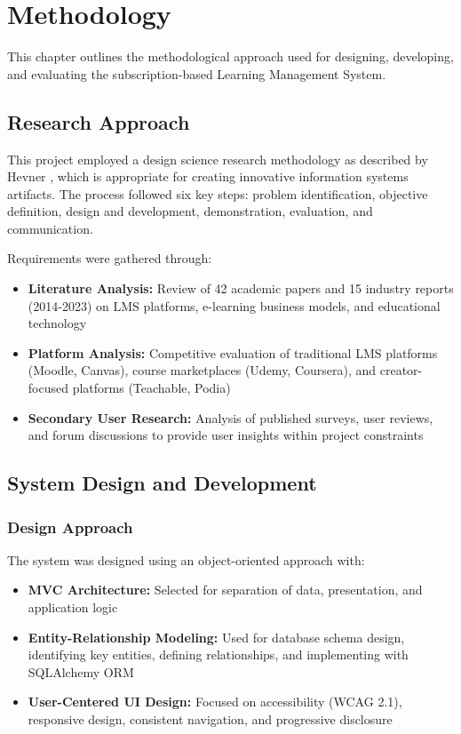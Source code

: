 \section{Methodology}

This chapter outlines the methodological approach used for designing, developing, and evaluating the subscription-based Learning Management System.

\subsection{Research Approach}

This project employed a design science research methodology as described by Hevner \cite{hevner2004}, which is appropriate for creating innovative information systems artifacts. The process followed six key steps: problem identification, objective definition, design and development, demonstration, evaluation, and communication.

Requirements were gathered through:

\begin{itemize}
    \item \textbf{Literature Analysis:} Review of 42 academic papers and 15 industry reports (2014-2023) on LMS platforms, e-learning business models, and educational technology
    
    \item \textbf{Platform Analysis:} Competitive evaluation of traditional LMS platforms (Moodle, Canvas), course marketplaces (Udemy, Coursera), and creator-focused platforms (Teachable, Podia)
    
    \item \textbf{Secondary User Research:} Analysis of published surveys, user reviews, and forum discussions to provide user insights within project constraints
\end{itemize}

\subsection{System Design and Development}

\subsubsection{Design Approach}

The system was designed using an object-oriented approach with:

\begin{itemize}
    \item \textbf{MVC Architecture:} Selected for separation of data, presentation, and application logic \cite{leff2001}
    
    \item \textbf{Entity-Relationship Modeling:} Used for database schema design, identifying key entities, defining relationships, and implementing with SQLAlchemy ORM
    
    \item \textbf{User-Centered UI Design:} Focused on accessibility (WCAG 2.1), responsive design, consistent navigation, and progressive disclosure
\end{itemize}

